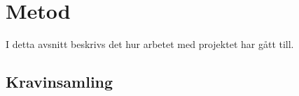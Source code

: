 \documentclass{article}
\begin{document}
 
\section{Metod}


I detta avsnitt beskrivs det hur arbetet med projektet har gått till.
\subsection{Kravinsamling}

\end{document}

